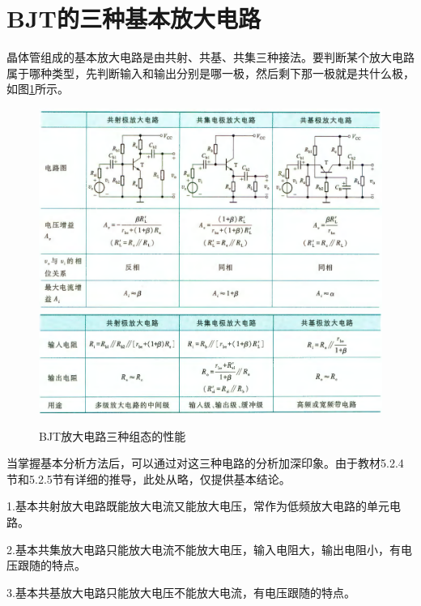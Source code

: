 \section{BJT的三种基本放大电路}
晶体管组成的基本放大电路是由共射、共基、共集三种接法。要判断某个放大电路属于哪种类型，先判断输⼊和输出分别是哪⼀极，然后剩下那一极就是共什么极，如图\ref{BJT放大电路三种组态的性能}所示。

\begin{figure}[htb]
    \centering
    \includegraphics[width=0.9\linewidth]{pic/BJT三种类型的放大电路-1.png}
    \includegraphics[width=0.9\linewidth]{pic/BJT三种类型的放大电路-2.png}
    \caption{BJT放大电路三种组态的性能\cite{康华光}\label{BJT放大电路三种组态的性能}}
\end{figure}

当掌握基本分析方法后，可以通过对这三种电路的分析加深印象。由于教材5.2.4节和5.2.5节有详细的推导，此处从略，仅提供基本结论。

1.基本共射放大电路既能放大电流又能放大电压，常作为低频放大电路的单元电路。

2.基本共集放大电路只能放大电流不能放大电压，输入电阻大，输出电阻小，有电压跟随的特点。

3.基本共基放大电路只能放大电压不能放大电流，有电压跟随的特点。